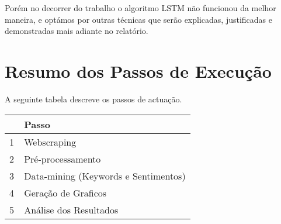 Porém no decorrer do trabalho o algoritmo LSTM não funcionou da melhor maneira, e optámos por outras técnicas que serão explicadas, justificadas e demonstradas mais adiante no relatório.

\section{Resumo dos Passos de Execução}

A seguinte tabela descreve os passos de actuação.

\begin{table}[!ht]
    \centering
    \begin{tabular}{|l|l|}
    \hline
        ~ & Passo \\ \hline
        1 & Webscraping \\ \hline
        2 & Pré-processamento \\ \hline
        3 & Data-mining (Keywords e Sentimentos) \\ \hline
        4 & Geração de Graficos \\ \hline
        5 & Análise dos Resultados \\ \hline
    \end{tabular}
    \label{table:1}
\end{table}